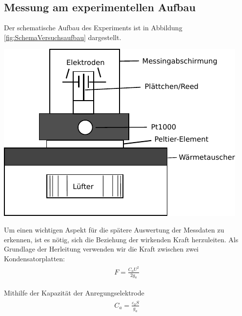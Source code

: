 \subsection{Messung am experimentellen Aufbau}

Der schematische Aufbau des Experiments ist in Abbildung \ref{fig:SchemaVersuchsaufbau} dargestellt.

\minipage{\linewidth}
    \begin{center}
        \captionsetup{type=figure}
        \begin{adjustbox}{max width=\linewidth, keepaspectratio}
            \includegraphics[]{pdf/Versuchsaufbau}
        \end{adjustbox}
        \label{fig:SchemaVersuchsaufbau}
    \end{center}
\endminipage

Um einen wichtigen Aspekt für die spätere Auswertung der Messdaten zu erkennen, ist es nötig, sich die Beziehung der wirkenden Kraft herzuleiten.
Als Grundlage der Herleitung verwenden wir die Kraft zwischen zwei Kondensatorplatten:
\begin{align}
    \label{eq:KraftKondensatorplatten}
    \begin{split}
        F = \frac{C_a U^2}{2 g_a}
    \end{split}
\end{align}

Mithilfe der Kapazität der Anregungselektrode
\begin{align}
    \label{eq:KapazitaetAnregungselektrode}
    \begin{split}
        C_a = \frac{\varepsilon_0 S}{g_a}
    \end{split}
\end{align}

